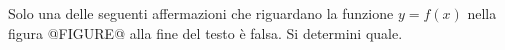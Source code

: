 Solo una delle seguenti affermazioni che riguardano la funzione $y=f(x)$ 
nella figura @FIGURE@ alla fine del testo
è falsa. Si determini quale.
